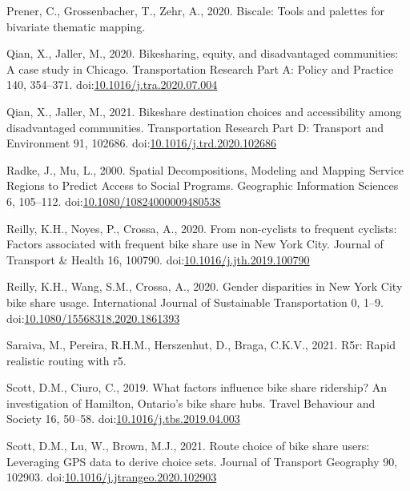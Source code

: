 \documentclass[]{elsarticle} %
\begin{document}
\leavevmode\hypertarget{ref-R-biscale}{}%
Prener, C., Grossenbacher, T., Zehr, A., 2020. Biscale: Tools and
palettes for bivariate thematic mapping.

\leavevmode\hypertarget{ref-qianBikesharingEquityDisadvantaged2020}{}%
Qian, X., Jaller, M., 2020. Bikesharing, equity, and disadvantaged
communities: A case study in Chicago. Transportation Research Part A:
Policy and Practice 140, 354--371.
doi:\href{https://doi.org/10.1016/j.tra.2020.07.004}{10.1016/j.tra.2020.07.004}

\leavevmode\hypertarget{ref-qianBikeshareDestinationChoices2021}{}%
Qian, X., Jaller, M., 2021. Bikeshare destination choices and
accessibility among disadvantaged communities. Transportation Research
Part D: Transport and Environment 91, 102686.
doi:\href{https://doi.org/10.1016/j.trd.2020.102686}{10.1016/j.trd.2020.102686}

\leavevmode\hypertarget{ref-radkeSpatialDecompositionsModeling2000}{}%
Radke, J., Mu, L., 2000. Spatial Decompositions, Modeling and Mapping
Service Regions to Predict Access to Social Programs. Geographic
Information Sciences 6, 105--112.
doi:\href{https://doi.org/10.1080/10824000009480538}{10.1080/10824000009480538}

\leavevmode\hypertarget{ref-reillyNoncyclistsFrequentCyclists2020}{}%
Reilly, K.H., Noyes, P., Crossa, A., 2020. From non-cyclists to frequent
cyclists: Factors associated with frequent bike share use in New York
City. Journal of Transport \& Health 16, 100790.
doi:\href{https://doi.org/10.1016/j.jth.2019.100790}{10.1016/j.jth.2019.100790}

\leavevmode\hypertarget{ref-reillyGenderDisparitiesNew2020}{}%
Reilly, K.H., Wang, S.M., Crossa, A., 2020. Gender disparities in New
York City bike share usage. International Journal of Sustainable
Transportation 0, 1--9.
doi:\href{https://doi.org/10.1080/15568318.2020.1861393}{10.1080/15568318.2020.1861393}

\leavevmode\hypertarget{ref-R-r5r}{}%
Saraiva, M., Pereira, R.H.M., Herszenhut, D., Braga, C.K.V., 2021. R5r:
Rapid realistic routing with r5.

\leavevmode\hypertarget{ref-scottWhatFactorsInfluence2019}{}%
Scott, D.M., Ciuro, C., 2019. What factors influence bike share
ridership? An investigation of Hamilton, Ontario's bike share hubs.
Travel Behaviour and Society 16, 50--58.
doi:\href{https://doi.org/10.1016/j.tbs.2019.04.003}{10.1016/j.tbs.2019.04.003}

\leavevmode\hypertarget{ref-scottRouteChoiceBike2021}{}%
Scott, D.M., Lu, W., Brown, M.J., 2021. Route choice of bike share
users: Leveraging GPS data to derive choice sets. Journal of Transport
Geography 90, 102903.
doi:\href{https://doi.org/10.1016/j.jtrangeo.2020.102903}{10.1016/j.jtrangeo.2020.102903}
\end{document}
